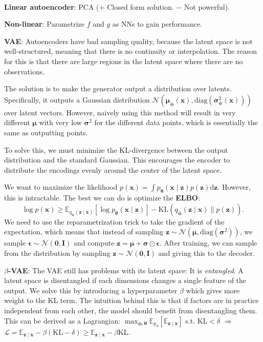 \documentclass{article}
\newcommand{\E}{\mathbb{E}}
\renewcommand{\vec}[1]{\bm{#1}}
\newcommand{\mat}[1]{\bm{#1}}
\newenvironment{topic}[1]
{\textbf{\sffamily \colorbox{black}{\rlap{\textbf{\textcolor{white}{#1}}}\hspace{\linewidth}\hspace{-2\fboxsep}}} \\ \vspace{0.2cm}}
{}
\begin{document}
\begin{multicols*}{2}
\begin{topic}{Autoencoders}
        \textbf{Linear autoencoder}: PCA ($+$ Closed form solution. $-$ Not powerful).

        \textbf{Non-linear}: Parametrize $f$ and $g$ as NNs to gain performance.

        \textbf{VAE}: Autoencoders have bad sampling quality, because the latent space is not
        well-structured, meaning that there is no continuity or interpolation. The reason for this is
        that there are large regions in the latent space where there are no observations.

        The solution is to make the generator output a distribution over latents. Specifically, it outputs
        a Gaussian distribution $\mathcal{N}(\vec{\mu}_{\vec{\phi}}(\vec{x}),
            \mathrm{diag}(\vec{\sigma}_{\vec{\phi}}^2(\vec{x})))$ over latent vectors. However, naively using
        this method will result in very different $\vec{\mu}$ with very low $\vec{\sigma}^2$ for the
        different data points, which is essentially the same as outputting points.

        To solve this, we must minimize the KL-divergence between the output distribution and the standard
        Gaussian. This encourages the encoder to distribute the encodings evenly around the center of the
        latent space.

        We want to maximize the likelihood $p(\vec{x}) = \int p_{\vec{\theta}}(\vec{x} \mid \vec{z})
            p(\vec{z}) \mathrm{d}\vec{z}$. However, this is intractable. The best we can do is optimize the
        \textbf{ELBO}: \[
            \log p(\vec{x}) \geq \E_{q_{\vec{\phi}}(\vec{z} \mid \vec{x})} [\log p_{\vec{\theta}}(\vec{x} \mid \vec{z})] - \mathrm{KL}(q_{\vec{\phi}}(\vec{z} \mid \vec{x}) \lVert p(\vec{z})).
        \]
        We need to use the reparametrization trick to take the gradient of the expectation, which means
        that instead of sampling $\vec{z} \sim \mathcal{N}(\vec{\mu}, \mathrm{diag}(\vec{\sigma}^2))$, we
        sample $\vec{\epsilon} \sim \mathcal{N}(\vec{0}, \mat{I})$ and compute $\vec{z} = \vec{\mu} +
            \vec{\sigma} \odot \vec{\epsilon}$. After training, we can sample from the distribution by sampling
        $\vec{z} \sim \mathcal{N}(\vec{0}, \mat{I})$ and giving this to the decoder.

        \textbf{$\beta$-VAE}: The VAE still has problems with its latent space: It is \textit{entangled}. A
        latent space is disentangled if each dimensions changes a single feature of the output. We
        solve this by introducing a hyperparameter $\beta$ which gives more weight to the KL term. The
        intuition behind this is that if factors are in practice independent from each other, the
        model should benefit from disentangling them. This can be derived as a
        Lagrangian: $\max_{\vec{\phi},\vec{\theta}} \E_{p_{\mathrm{d}}}[\E_{\vec{z}\mid \vec{x}}]$ s.t. $\mathrm{KL} < \delta$ $\Rightarrow$
        $\mathcal{L} = \E_{\vec{z}\mid \vec{x}} - \beta(\mathrm{KL} - \delta) \geq \E_{\vec{z}\mid \vec{x}} - \beta \mathrm{KL}$.


\end{topic}
\end{multicols*}
\end{document}
